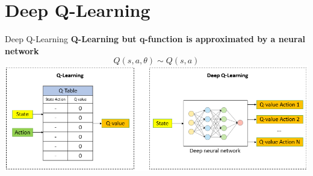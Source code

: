 \documentclass[presentation, 9pt]{beamer}\mode<presentation>{\usetheme{AMSBolognaFC}}
\begin{document}
\section{Deep Q-Learning}
\begin{frame}{Deep Q-Learning}
	\centering
	\textbf{Q-Learning but q-function is approximated by a neural network}
	$$ Q(s, a, \theta) \sim Q(s, a) $$
	\includegraphics[width=\textwidth]{img/dql-vs-ql-1.png}
\end{frame}
\end{document}
